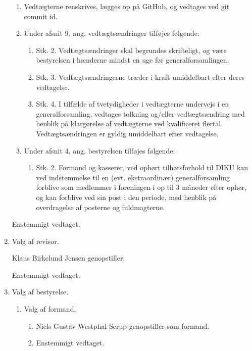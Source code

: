 \documentclass[a4paper]{article}
\begin{document}
\begin{enumerate}
\begin{enumerate}
\item Vedtægterne renskrives, lægges op på GitHub, og vedtages ved git commit
id.
\item Under afsnit 9, ang. vedtægtsændringer tilføjes følgende:
\begin{enumerate}
\item Stk. 2. Vedtægtsændringer skal begrundes skrifteligt, og være bestyrelsen
i hænderne mindst en uge før generalforsamlingen.
\item Stk. 3. Vedtægtsændringerne træder i kraft umiddelbart efter deres
vedtagelse.
\item Stk. 4. I tilfælde af tvetydigheder i vedtægterne undervejs i en
generalforsamling, vedtages tolkning og/eller vedtægtsændring med henblik på
klargørelse af vedtægterne ved kvalificeret flertal. Vedtægtsændringen er gyldig
umiddelbart efter vedtagelse.
\end{enumerate}
\item Under afsnit 4, ang. bestyrelsen tilføjes følgende:
\begin{enumerate}
\item Stk. 2. Formand og kasserer, ved ophørt tilhørsforhold til DIKU kan ved
indstemmelse til en (evt. ekstraordinær) generalforsamling forblive som
medlemmer i foreningen i op til 3 måneder efter ophør, og kan forblive ved sin
post i den periode, med henblik på overdragelse af posterne og fuldmagterne.
\end{enumerate}
\end{enumerate}

Enstemmigt vedtaget.


\item[\textsection 8] Valg af revisor.

Klaus Birkelund Jensen genopstiller.

Enstemmigt vedtaget.


\item[\textsection 9] Valg af bestyrelse.

\begin{enumerate}

\item Valg af formand.

\begin{enumerate}

\item Niels Gustav Westphal Serup genopstiller som formand.

\item Enstemmigt vedtaget.


\end{enumerate}
\end{enumerate}
\end{enumerate}
\end{document}
